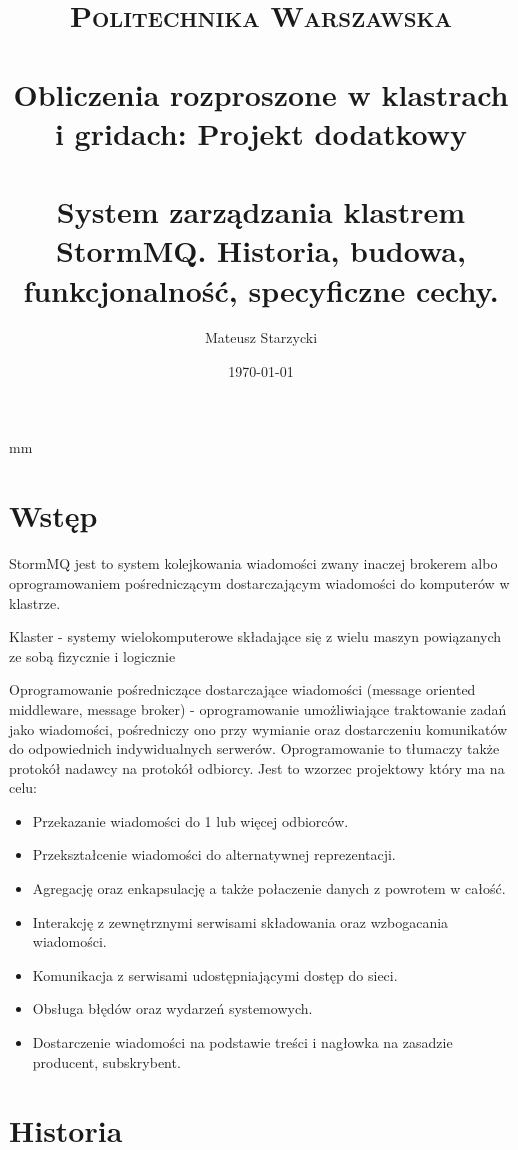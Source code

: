 \documentclass[paper=a4, fontsize=11pt]{scrartcl} %
\title{ 
    \normalfont \normalsize 
    \textsc{Politechnika Warszawska} \\ [25pt] %
    \horrule{0.5pt} \\[0.4cm] %
    \huge Obliczenia rozproszone w klastrach i gridach: Projekt dodatkowy\\ %
    \horrule{2pt} \\[0.5cm] %
    System zarządzania klastrem StormMQ. Historia, budowa, funkcjonalność, specyficzne cechy.
}
\author{Mateusz Starzycki} %
\date{\normalsize\today} %
\numberwithin{equation}{section} %
\numberwithin{figure}{section} %
\numberwithin{table}{section} %
\begin{document}
 mm

\maketitle %


\newpage

\section{Wstęp}

StormMQ jest to system kolejkowania wiadomości zwany inaczej brokerem albo oprogramowaniem pośredniczącym dostarczającym wiadomości do 
komputerów w klastrze.

Klaster - systemy wielokomputerowe składające się z wielu maszyn powiązanych ze sobą fizycznie i logicznie

Oprogramowanie pośredniczące dostarczające wiadomości (message oriented middleware, message broker) - oprogramowanie umożliwiające 
traktowanie zadań jako wiadomości, pośredniczy ono przy wymianie oraz dostarczeniu komunikatów do odpowiednich indywidualnych serwerów.
Oprogramowanie to tłumaczy także protokół nadawcy na protokół odbiorcy. Jest to wzorzec projektowy który ma na celu:
\begin{itemize}
    \item Przekazanie wiadomości do 1 lub więcej odbiorców.
    \item Przekształcenie wiadomości do alternatywnej reprezentacji.
    \item Agregację oraz enkapsulację a także połaczenie danych z powrotem w całość.
    \item Interakcję z zewnętrznymi serwisami składowania oraz wzbogacania wiadomości.
    \item Komunikacja z serwisami udostępniającymi dostęp do sieci.
    \item Obsługa błędów oraz wydarzeń systemowych.
    \item Dostarczenie wiadomości na podstawie treści i nagłowka na zasadzie producent, subskrybent.
\end{itemize}

\section{Historia}
\end{document}
